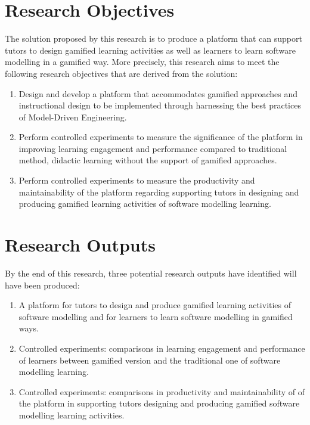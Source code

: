 \documentclass[12pt, a4paper]{report} \usepackage[titletoc]{appendix}
\begin{document}
\section{Research Objectives}
The solution proposed by this research is to produce a platform that can support tutors to design gamified learning activities as well as learners to learn software modelling in a gamified way. More precisely, this research aims to meet the following research objectives that are derived from the solution:
\begin{enumerate}
\item Design and develop a platform that accommodates gamified approaches and instructional design to be implemented through harnessing the best practices of Model-Driven Engineering. 
\item Perform controlled experiments to measure the significance of the platform in improving learning engagement and performance compared to traditional method, didactic learning without the support of gamified approaches.
\item Perform controlled experiments to measure the productivity and maintainability of the platform regarding supporting tutors in designing and producing gamified learning activities of software modelling learning. 
\end{enumerate}

\section{Research Outputs}
By the end of this research, three potential research outputs have identified will have been produced:
\begin{enumerate}
\item A platform for tutors to design and produce gamified learning activities of software modelling and for learners to learn software modelling in gamified ways. 
\item Controlled experiments: comparisons in learning engagement and performance of learners between gamified version and the traditional one of software modelling learning.
\item Controlled experiments: comparisons in productivity and maintainability of of the platform in supporting tutors designing and producing gamified software modelling learning activities.
\end{enumerate}
\end{document}
